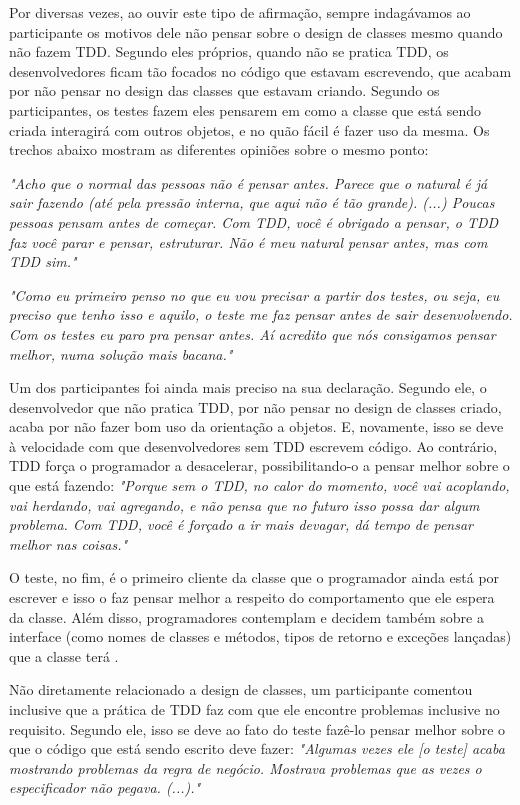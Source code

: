Por diversas vezes, ao ouvir este tipo de afirmação, sempre indagávamos ao participante
os motivos dele não pensar sobre o design de classes mesmo quando não fazem TDD. 
Segundo eles próprios, quando não se pratica TDD, os desenvolvedores ficam
tão focados no código que estavam escrevendo, que acabam por não pensar no
design das classes que estavam criando. Segundo os participantes, os testes fazem eles pensarem
em como a classe que está sendo criada interagirá com outros objetos, e no quão
fácil é fazer uso da mesma.
Os trechos abaixo mostram as diferentes opiniões sobre o mesmo ponto:

\textit{"Acho que o normal das pessoas não é pensar antes. Parece que o natural
é já sair fazendo (até pela pressão interna, que aqui não é tão grande). (...) Poucas pessoas pensam
antes de começar. Com TDD, você é obrigado a pensar, o TDD faz você parar e pensar, estruturar. Não
é meu natural pensar antes, mas com TDD sim."}

\textit{"Como eu primeiro penso no que eu vou precisar a partir dos testes, ou seja, eu preciso que tenho
isso e aquilo, o teste me faz pensar antes de sair desenvolvendo. Com os testes eu paro pra pensar antes.
Aí acredito que nós consigamos pensar melhor, numa solução mais bacana."}

Um dos participantes foi ainda mais preciso na sua declaração. Segundo ele, o desenvolvedor que não pratica
TDD, por não pensar no design de classes criado, acaba por não fazer bom uso da orientação a objetos.
E, novamente, isso se deve à velocidade com que desenvolvedores sem TDD escrevem código. Ao contrário,
TDD força o programador a desacelerar, possibilitando-o a pensar melhor sobre o que está fazendo:
\textit{"Porque sem o TDD, no calor do momento, você vai acoplando, vai herdando, vai agregando, e não pensa
que no futuro isso possa dar algum problema. Com TDD, você é forçado a ir mais devagar, dá tempo de pensar melhor nas
coisas."}

O teste, no fim, é o primeiro cliente da classe que o programador ainda está por escrever e 
isso o faz pensar melhor a respeito do comportamento que ele espera da classe. Além disso,
programadores contemplam e decidem também sobre a interface (como nomes de
classes e métodos, tipos de retorno e exceções lançadas) que a classe terá
\cite{janzen-saiedian}.

Não diretamente relacionado a design de classes, um participante comentou inclusive
que a prática de TDD faz com que ele encontre problemas inclusive no requisito. Segundo ele,
isso se deve ao fato do teste fazê-lo pensar melhor sobre o que o código que está 
sendo escrito deve fazer:
\textit{"Algumas vezes ele [o teste] acaba mostrando problemas da regra de negócio. Mostrava problemas
que as vezes o especificador não pegava. (...)."}

